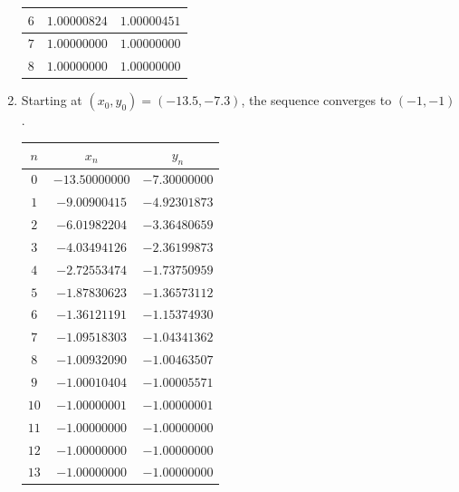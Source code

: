 \begin{example}
\begin{enumerate}
\begin{center}
\begin{tabular}{|c|c|c|}
	$6$ & $1.00000824$ & $1.00000451$ \\ \hline 
	$7$ & $1.00000000$ & $1.00000000$ \\ \hline 
	$8$ & $1.00000000$ & $1.00000000$ \\ \hline 
	\end{tabular}
	\end{center}
	\item Starting at $(x_0, y_0) = (-13.5, -7.3)$, the sequence converges to $(-1,-1)$.  %
	\begin{center}
	\begin{tabular}{|c|c|c|} \hline 
	$n$ & $x_n$ & $y_n$ \\ \hline \hline 
	$0$ & $-13.50000000$ & $-7.30000000$ \\ \hline 
	$1$ & $-9.00900415$ & $-4.92301873$ \\ \hline 
	$2$ & $-6.01982204$ & $-3.36480659$ \\ \hline 
	$3$ & $-4.03494126$ & $-2.36199873$ \\ \hline 
	$4$ & $-2.72553474$ & $-1.73750959$ \\ \hline 
	$5$ & $-1.87830623$ & $-1.36573112$ \\ \hline 
	$6$ & $-1.36121191$ & $-1.15374930$ \\ \hline 
	$7$ & $-1.09518303$ & $-1.04341362$ \\ \hline 
	$8$ & $-1.00932090$ & $-1.00463507$ \\ \hline 
	$9$ & $-1.00010404$ & $-1.00005571$ \\ \hline 
	$10$ & $-1.00000001$ & $-1.00000001$ \\ \hline 
	$11$ & $-1.00000000$ & $-1.00000000$ \\ \hline 
	$12$ & $-1.00000000$ & $-1.00000000$ \\ \hline 
	$13$ & $-1.00000000$ & $-1.00000000$ \\ \hline 
	\end{tabular}
	\end{center}
\end{enumerate}
\end{example}

